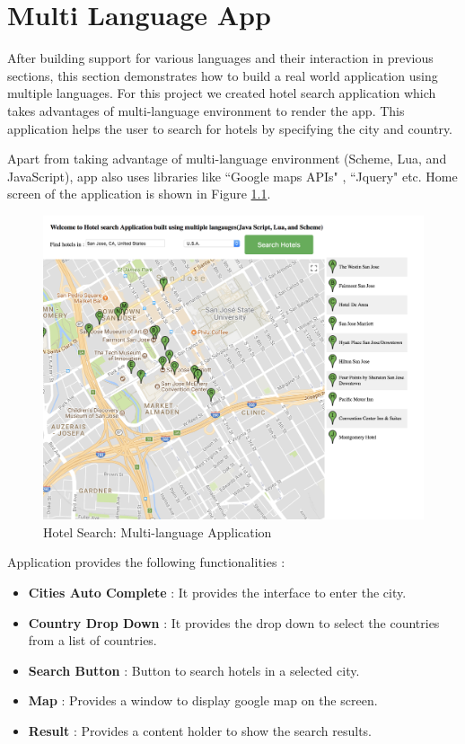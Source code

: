 \chapter{Multi Language App}

After building support for various languages and their interaction in previous sections, this section demonstrates how to build a real world application using multiple languages. For this project we created hotel search application which takes advantages of multi-language environment to render the app. This application helps the user to search for hotels by specifying the city and country. 

Apart from taking advantage of multi-language environment (Scheme, Lua, and JavaScript), app also uses libraries like ``Google maps APIs" \cite{googlemapsapi}, ``Jquery" \cite{jquery} etc. Home screen of the application is shown in Figure \ref{fig:multilangapp}.

\begin{figure}[H]
	\begin{center}
		\includegraphics[width=\linewidth]{./images/multilangapp.png}
	\end{center}
	\caption{Hotel Search: Multi-language Application}
	\label{fig:multilangapp}
\end{figure}

Application provides the following functionalities : 
\begin{itemize}
	\item {\textbf{Cities Auto Complete} : It provides the interface to enter the city. }
	\item {\textbf{Country Drop Down} : It provides the drop down to select the countries from a list of countries.}
	\item {\textbf{Search Button} : Button to search hotels in a selected city.}
	\item {\textbf{Map} : Provides a window to display google map on the screen.}
	\item {\textbf{Result} : Provides a content holder to show the search results.}
\end{itemize}

